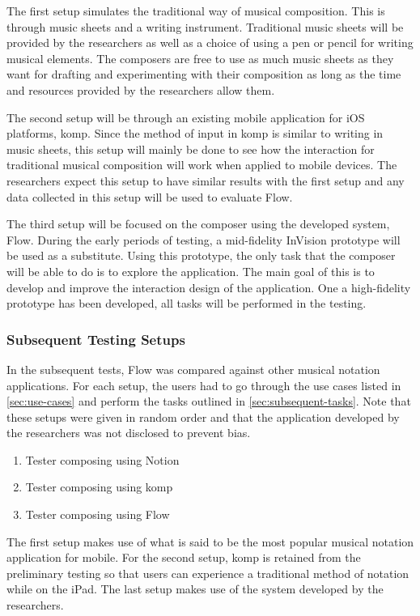 The first setup simulates the traditional way of musical composition. This is through music sheets and a writing instrument. Traditional music sheets will be provided by the researchers as well as a choice of using a pen or pencil for writing musical elements. The composers are free to use as much music sheets as they want for drafting and experimenting with their composition as long as the time and resources provided by the researchers allow them.

The second setup will be through an existing mobile application for iOS platforms, komp. Since the method of input in komp is similar to writing in music sheets, this setup will mainly be done to see how the interaction for traditional musical composition will work when applied to mobile devices. The researchers expect this setup to have similar results with the first setup and any data collected in this setup will be used to evaluate Flow.

The third setup will be focused on the composer using the developed system, Flow. During the early periods of testing, a mid-fidelity InVision prototype will be used as a substitute. Using this prototype, the only task that the composer will be able to do is to explore the application. The main goal of this is to develop and improve the interaction design of the application. One a high-fidelity prototype has been developed, all tasks will be performed in the testing.

\subsubsection{Subsequent Testing Setups}

In the subsequent tests, Flow was compared against other musical notation applications. For each setup, the users had to go through the use cases listed in \ref{sec:use-cases} and perform the tasks outlined in \ref{sec:subsequent-tasks}. Note that these setups were given in random order and that the application developed by the researchers was not disclosed to prevent bias.

\begin{enumerate}
\item Tester composing using Notion
\item Tester composing using komp
\item Tester composing using Flow
\end{enumerate}

The first setup makes use of what is said to be the most popular musical notation application for mobile. For the second setup, komp is retained from the preliminary testing so that users can experience a traditional method of notation while on the iPad. The last setup makes use of the system developed by the researchers.

